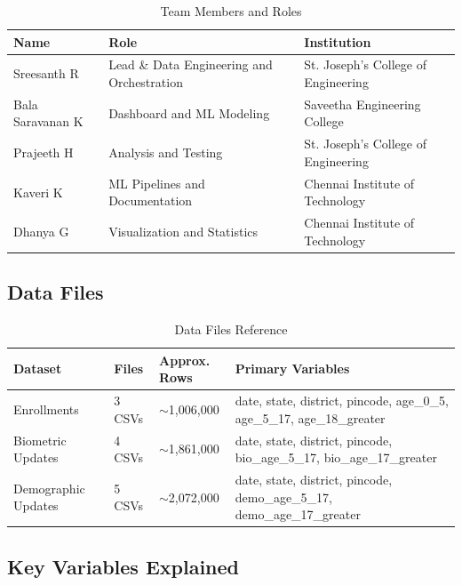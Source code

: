 \documentclass[11pt, a4paper]{article}
\begin{document}
\vspace{1em}

\begin{table}[H]
\caption{Team Members and Roles}
{\small
\begin{tabularx}{\textwidth}{|Y|Y|Y|}
\hline
\textbf{Name} & \textbf{Role} & \textbf{Institution} \\ \hline
Sreesanth R & Lead \& Data Engineering and Orchestration & St. Joseph's College of Engineering \\ \hline
Bala Saravanan K & Dashboard and ML Modeling & Saveetha Engineering College \\ \hline
Prajeeth H & Analysis and Testing & St. Joseph's College of Engineering \\ \hline
Kaveri K & ML Pipelines and Documentation & Chennai Institute of Technology \\ \hline
Dhanya G & Visualization and Statistics & Chennai Institute of Technology \\ \hline
\end{tabularx}
}
\end{table}
\vspace{1em}

\subsection{Data Files}

\vspace{0.8em}
\begin{table}[H]
\caption{Data Files Reference}
{\small
\begin{tabularx}{\textwidth}{|Y|Y|Y|Y|}
\hline
\textbf{Dataset} & \textbf{Files} & \textbf{Approx. Rows} & \textbf{Primary Variables} \\ \hline
Enrollments & 3 CSVs & $\sim$1,006,000 & date, state, district, pincode, age\_0\_5, age\_5\_17, age\_18\_greater \\ \hline
Biometric Updates & 4 CSVs & $\sim$1,861,000 & date, state, district, pincode, bio\_age\_5\_17, bio\_age\_17\_greater \\ \hline
Demographic Updates & 5 CSVs & $\sim$2,072,000 & date, state, district, pincode, demo\_age\_5\_17, demo\_age\_17\_greater \\ \hline
\end{tabularx}
}
\end{table}
\vspace{1em}

\subsection{Key Variables Explained}
\end{document}
